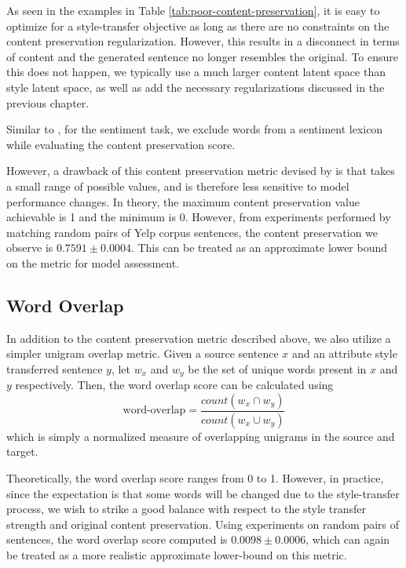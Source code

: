 As seen in the examples in Table \ref{tab:poor-content-preservation}, it is easy to optimize for a style-transfer objective as long as there are no constraints on the content preservation regularization. However, this results in a disconnect in terms of content and the generated sentence no longer resembles the original. To ensure this does not happen, we typically use a much larger content latent space than style latent space, as well as add the necessary regularizations discussed in the previous chapter.

Similar to \cite{fu2017style}, for the sentiment task, we exclude words from a sentiment lexicon \citep{hu2004mining} while evaluating the content preservation score.

However, a drawback of this content preservation metric devised by \cite{fu2017style} is that takes a small range of possible values, and is therefore less sensitive to model performance changes. In theory, the maximum content preservation value achievable is 1 and the minimum is 0. However, from experiments performed by matching random pairs of Yelp corpus sentences, the content preservation we observe is $0.7591 \pm 0.0004$. This can be treated as an approximate lower bound on the metric for model assessment.

\subsection{Word Overlap}

In addition to the content preservation metric described above, we also utilize a simpler unigram overlap metric. Given a source sentence $x$ and an attribute style transferred sentence $y$, let $w_x$ and $w_y$ be the set of unique words present in $x$ and $y$ respectively. Then, the word overlap score can be calculated using
\begin{equation*}
	\text{word-overlap} = \frac{count(w_x \cap w_y)}{count(w_x \cup w_y)}
\end{equation*}
which is simply a normalized measure of overlapping unigrams in the source and target.

Theoretically, the word overlap score ranges from 0 to 1. However, in practice, since the expectation is that some words will be changed due to the style-transfer process, we wish to strike a good balance with respect to the style transfer strength and original content preservation. Using experiments on random pairs of sentences, the word overlap score computed is $0.0098 \pm 0.0006$, which can again be treated as a more realistic approximate lower-bound on this metric.

